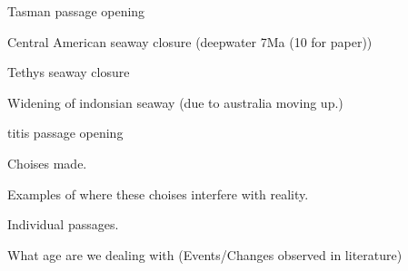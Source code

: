 Tasman passage opening 

Central American seaway closure \cite{Molnar2008Jun} (deepwater 7Ma (10 for paper))\cite{Pindell1988Dec}

Tethys seaway closure \cite{Hamon2013Nov}

Widening of indonsian seaway (due to australia moving up.)


titis passage opening 

Choises made. 

Examples of where these choises interfere with reality.

Individual passages.

What age are we dealing with (Events/Changes observed in literature)

